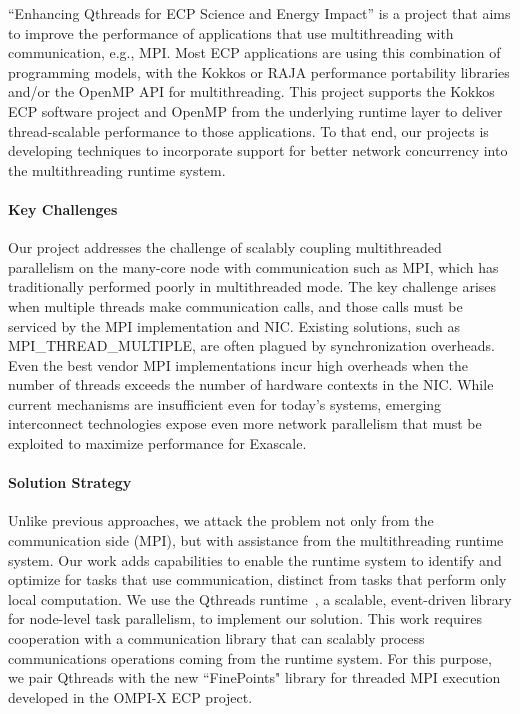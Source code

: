 ``Enhancing Qthreads for ECP Science and Energy Impact'' is a project that aims to improve the performance of applications that use multithreading with communication, e.g., MPI.  Most ECP applications are using this combination of programming models, with the Kokkos or RAJA performance portability libraries and/or the OpenMP API for multithreading.  This project supports the Kokkos ECP software project and OpenMP from the underlying runtime layer to deliver thread-scalable performance to those applications.  To that end, our projects is developing techniques to incorporate support for better network concurrency into the multithreading runtime system.

\paragraph{Key  Challenges}
Our project addresses the challenge of scalably coupling multithreaded parallelism on the many-core node with communication such as MPI, which has traditionally performed poorly in multithreaded mode.  The key challenge arises when multiple threads make communication calls, and those calls must be serviced by the MPI implementation and NIC.  Existing solutions, such as MPI\_THREAD\_MULTIPLE, are often plagued by synchronization overheads.  Even the best vendor MPI implementations incur high overheads when the number of threads exceeds the number of hardware contexts in the NIC. 
While current mechanisms are insufficient even for today's systems, emerging interconnect technologies expose even more network parallelism that must be exploited to maximize performance for Exascale.

\paragraph{Solution Strategy}

Unlike previous approaches, we attack the problem not only from the communication side (MPI), but with assistance from the multithreading runtime system.  Our work adds capabilities to enable the runtime system to identify and optimize for tasks that use communication, distinct from tasks that perform only local computation.  We use the Qthreads runtime~\cite{wheeler2008qthreads}, a scalable, event-driven library for node-level task parallelism, to implement our solution.  This work requires cooperation with a communication library that can scalably process communications operations coming from the runtime system.  For this purpose, we pair Qthreads with the new “FinePoints" library for threaded MPI execution developed in the OMPI-X ECP project.

